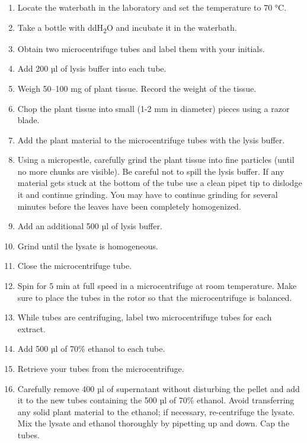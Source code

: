 \documentclass[]{book}
\providecommand{\tightlist}{%
  \setlength{\itemsep}{0pt}\setlength{\parskip}{0pt}}
\begin{document}
\begin{enumerate}
\def\labelenumi{\arabic{enumi}.}
\tightlist
\item
  Locate the waterbath in the laboratory and set the temperature to 70 °C.
\item
  Take a bottle with ddH\textsubscript{2}O and incubate it in the waterbath.
\item
  Obtain two microcentrifuge tubes and label them with your initials.
\item
  Add 200 µl of lysis buffer into each tube.
\item
  Weigh 50--100 mg of plant tissue. Record the weight of the tissue.
\item
  Chop the plant tissue into small (1-2 mm in diameter) pieces using a razor blade.
\item
  Add the plant material to the microcentrifuge tubes with the lysis buffer.
\item
  Using a micropestle, carefully grind the plant tissue into fine particles (until no more chunks are visible). Be careful not to spill the lysis buffer. If any material gets stuck at the bottom of the tube use a clean pipet tip to dislodge it and continue grinding. You may have to continue grinding for several minutes before the leaves have been completely homogenized.
\item
  Add an additional 500 µl of lysis buffer.
\item
  Grind until the lysate is homogeneous.
\item
  Close the microcentrifuge tube.
\item
  Spin for 5 min at full speed in a microcentrifuge at room temperature. Make sure to place the tubes in the rotor so that the microcentrifuge is balanced.\\
\item
  While tubes are centrifuging, label two microcentrifuge tubes for each extract.
\item
  Add 500 µl of 70\% ethanol to each tube.
\item
  Retrieve your tubes from the microcentrifuge.
\item
  Carefully remove 400 µl of supernatant without disturbing the pellet and add it to the new tubes containing the 500 µl of 70\% ethanol. Avoid transferring any solid plant material to the ethanol; if necessary, re-centrifuge the lysate.
  Mix the lysate and ethanol thoroughly by pipetting up and down. Cap the tubes.
\end{enumerate}
\end{document}
